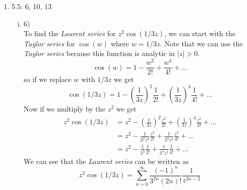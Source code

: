 \documentclass[11pt]{article}
\begin{document}
\begin{enumerate}
\begin{enumerate}[(i)]
\end{enumerate}
\item 5.5: 6, 10, 13
\begin{enumerate}[(i)]
\item 6)\\
To find the \emph{Laurent series} for $z^2\cos(1/3z)$, we can start with the \emph{Taylor series} for $\cos(w)$ where $w=1/3z$. Note that we can use the \emph{Taylor series} because this function is analytic in $|z|>0$.
$$\cos(w) = 1 - \frac{w^2}{2!} + \frac{w^4}{4!}+...$$
so if we replace $w$ with $1/3z$ we get 
$$\cos(1/3z) = 1 - \left(\frac{1}{3z}\right)^2\frac{1}{2!} + \left(\frac{1}{3z}\right)^4\frac{1}{4!}+...$$
Now if we multiply by the $z^2$ we get
\begin{align*}
z^2\cos(1/3z) &= z^2 - \left(\frac{1}{3z}\right)^2\frac{z^2}{2!} + \left(\frac{1}{3z}\right)^4\frac{z^2}{4!}+...\\
&= z^2 - \frac{1}{3^2z^2}\frac{z^2}{2!} + \frac{1}{3^4z^4}\frac{z^2}{4!}+...\\
&= z^2 - \frac{1}{3^2}\frac{1}{2!} + \frac{1}{3^4z^2}\frac{1}{4!}+...
\end{align*}
We can see that the \emph{Laurent series} can be written as
$$z^2\cos\left(1/3z\right) = \sum_{n=0}^{\infty}\frac{(-1)^n}{3^{2n}(2n)!}\frac{1}{z^{2n-2}}$$


\end{enumerate}
\end{enumerate}
\end{document}
